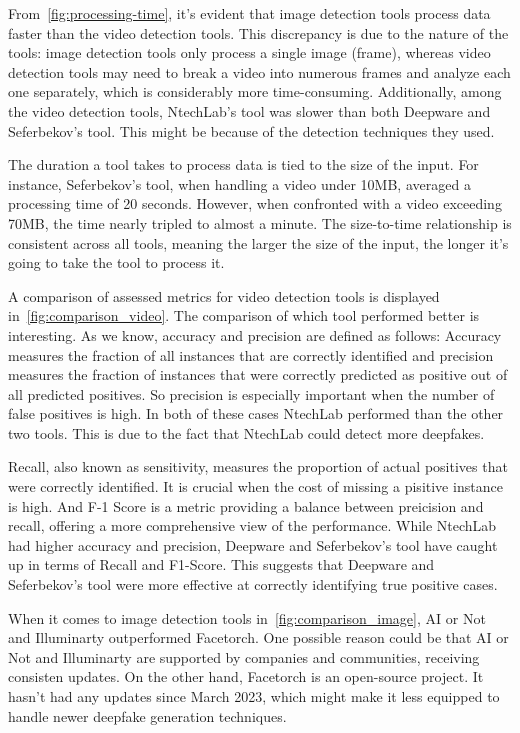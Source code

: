 From~\autoref{fig:processing-time}, it's evident that image detection tools process data faster
than the video detection tools. This discrepancy is due to the nature of the tools:
image detection tools only process a single image (frame), whereas video detection tools may 
need to break a video into numerous frames and analyze each one separately, which is considerably
more time-consuming. Additionally, among the video detection tools, NtechLab's tool was slower than 
both Deepware and Seferbekov's tool. This might be because of the detection techniques they used.

The duration a tool takes to process data is tied to the size of the input. For instance, 
Seferbekov's tool, when handling a video under 10MB, averaged a processing time of 20 seconds. However,
when confronted with a video exceeding 70MB, the time nearly tripled to almost a minute. 
The size-to-time relationship is consistent across all tools, meaning the larger the size of the
input, the longer it's going to take the tool to process it.

A comparison of assessed metrics for video detection tools is displayed in~\autoref{fig:comparison_video}.
The comparison of which tool performed better is interesting. As we know, accuracy and precision 
are defined as follows: Accuracy measures the fraction of all instances that are correctly 
identified and precision measures the fraction of instances that were correctly predicted as 
positive out of all predicted positives. So precision is especially important when the number
of false positives is high. In both of these cases NtechLab performed than the other two 
tools. This is due to the fact that NtechLab could detect more deepfakes.

Recall, also known as sensitivity, measures the proportion of actual positives that were 
correctly identified. It is crucial when the cost of missing a pisitive instance is high.
And F-1 Score is a metric providing a balance between preicision and recall, offering a more 
comprehensive view of the performance. While NtechLab had higher accuracy and precision, 
Deepware and Seferbekov's tool have caught up in terms of Recall and F1-Score. This suggests that
Deepware and Seferbekov's tool were more effective at correctly identifying true positive cases.

When it comes to image detection tools in~\autoref{fig:comparison_image}, AI or Not and 
Illuminarty outperformed Facetorch. One possible reason could be that AI or Not and 
Illuminarty are supported by companies and communities, receiving consisten updates. 
On the other hand, Facetorch is an open-source project. It hasn't had any updates 
since March 2023, which might make it less equipped to handle newer deepfake generation
techniques.

